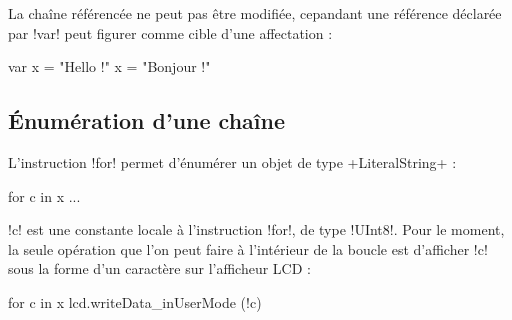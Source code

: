 La chaîne référencée ne peut pas être modifiée, cepandant une référence déclarée par \omnibus!var! peut figurer comme cible d'une affectation :
\begin{OMNIBUS}
var x = "Hello !"
x = "Bonjour !"
\end{OMNIBUS}

\subsection{Énumération d'une chaîne}

L'instruction \omnibus!for! permet d'énumérer un objet de type \omnibus+LiteralString+ :
\begin{OMNIBUS}
for c in x {
  ...
}
\end{OMNIBUS}

\omnibus!c! est une constante locale à l'instruction \omnibus!for!, de type \omnibus!UInt8!. Pour le moment, la seule opération que l'on peut faire à l'intérieur de la boucle est d'afficher \omnibus!c! sous la forme d'un caractère sur l'afficheur LCD :
\begin{OMNIBUS}
for c in x {
  lcd.writeData_inUserMode (!c)
}
\end{OMNIBUS}



